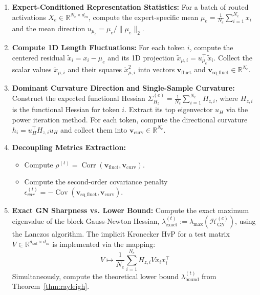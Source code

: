 \documentclass[11pt]{article}
\begin{document}
\begin{enumerate}
    \item \textbf{Expert-Conditioned Representation Statistics:} For a batch of routed activations $X_e \in \mathbb{R}^{N_e \times d_{in}}$, compute the expert-specific mean $\mu_e = \frac{1}{N_e}\sum_{i=1}^{N_e} x_i$ and the mean direction $u_{\mu_e} = \mu_e / \|\mu_e\|_2$.
    
    \item \textbf{Compute 1D Length Fluctuations:} For each token $i$, compute the centered residual $\tilde{x}_i = x_i - \mu_e$ and its 1D projection $\tilde{x}_{\mu,i} = u_{\mu_e}^\top \tilde{x}_i$. Collect the scalar values $\tilde{x}_{\mu,i}$ and their squares $\tilde{x}_{\mu,i}^2$ into vectors $\mathbf{v}_{\mathrm{fluct}}$ and $\mathbf{v}_{\mathrm{sq\_fluct}} \in \mathbb{R}^{N_e}$.
    
    \item \textbf{Dominant Curvature Direction and Single-Sample Curvature:} Construct the expected functional Hessian $\Sigma_{H_z}^{(e)} = \frac{1}{N_e}\sum_{i=1}^{N_e} H_{z,i}$, where $H_{z,i}$ is the functional Hessian for token $i$. Extract its top eigenvector $u_H$ via the power iteration method. For each token, compute the directional curvature $h_i = u_H^\top H_{z,i} u_H$ and collect them into $\mathbf{v}_{\mathrm{curv}} \in \mathbb{R}^{N_e}$.
    
    \item \textbf{Decoupling Metrics Extraction:} 
    \begin{itemize}
        \item Compute $\rho^{(t)} = \operatorname{Corr}(\mathbf{v}_{\mathrm{fluct}}, \mathbf{v}_{\mathrm{curv}})$.
        \item Compute the second-order covariance penalty $\epsilon_{var}^{(t)} = - \operatorname{Cov}(\mathbf{v}_{\mathrm{sq\_fluct}}, \mathbf{v}_{\mathrm{curv}})$.
    \end{itemize}
    
    \item \textbf{Exact GN Sharpness vs. Lower Bound:} Compute the exact maximum eigenvalue of the block Gauss-Newton Hessian, $\lambda_{\text{exact}}^{(t)} := \lambda_{\max}(\mathcal{H}_{\mathrm{GN}}^{(e)})$, using the Lanczos algorithm. The implicit Kronecker HvP for a test matrix $V \in \mathbb{R}^{d_{out} \times d_{in}}$ is implemented via the mapping:
    \begin{equation}
        V \mapsto \frac{1}{N_e}\sum_{i=1}^{N_e} H_{z,i} V x_i x_i^\top
    \end{equation}
    Simultaneously, compute the theoretical lower bound $\lambda_{\text{bound}}^{(t)}$ from Theorem~\ref{thm:rayleigh}.
\end{enumerate}
\end{document}
